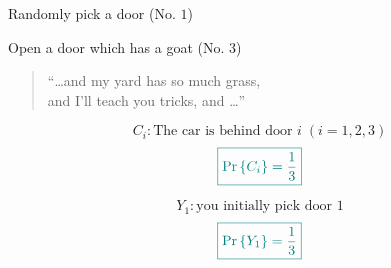 
\begin{frame}{}
  \centerline{}

  \pause
  \vspace{-0.40cm}
  \begin{description}[(S)he]
    \centering
    \item[You:] Randomly pick a door (No. $1$)
    \item[I:] Open a door which has a goat (No. $3$) \\
  \end{description}

  \pause
  \vspace{0.30cm}
  \centerline{}
\end{frame}

\begin{frame}{}

  \begin{quote}
    \centering
    {\Large ``\ldots and my yard has so much grass, \\ and I'll teach you tricks, and \ldots''}
  \end{quote}
\end{frame}

\begin{frame}{}
  \[
    C_i: \text{The car is behind door } i\; (i = 1, 2, 3)
  \]
  \[
    \textcolor{teal}{\boxed{\Pr\left\{C_i\right\} = \frac{1}{3}}}
  \]

  \pause
  \centerline{}

  \pause
  \vspace{0.50cm}
  \[
    Y_1: \text{you initially pick door } 1
  \]
  \[
    \textcolor{teal}{\boxed{\Pr\left\{Y_1\right\} = \frac{1}{3}}}
  \]

  \pause
  \centerline{}
\end{frame}

